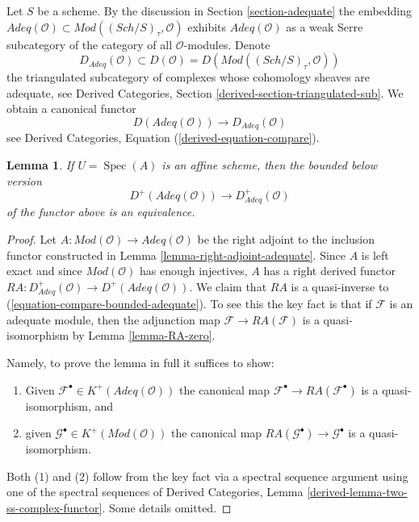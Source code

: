\documentclass{stacks-project}
\theoremstyle{plain}
\newtheorem{lemma}[subsection]{Lemma}
\theoremstyle{definition}
\theoremstyle{remark}
\numberwithin{equation}{subsection}
\def\Spec{\mathop{\mathrm{Spec}}}
\def\Sch{\mathit{Sch}}
\begin{document}
\noindent
Let $S$ be a scheme. By the discussion in
Section \ref{section-adequate}
the embedding
$\textit{Adeq}(\mathcal{O}) \subset
\textit{Mod}((\Sch/S)_\tau, \mathcal{O})$
exhibits $\textit{Adeq}(\mathcal{O})$ as a weak Serre subcategory of
the category of all $\mathcal{O}$-modules. Denote
$$
D_{\textit{Adeq}}(\mathcal{O}) \subset
D(\mathcal{O}) = D(\textit{Mod}((\Sch/S)_\tau, \mathcal{O}))
$$
the triangulated subcategory of complexes whose cohomology sheaves
are adequate, see
Derived Categories, Section \ref{derived-section-triangulated-sub}.
We obtain a canonical functor
$$
D(\textit{Adeq}(\mathcal{O}))
\longrightarrow
D_{\textit{Adeq}}(\mathcal{O})
$$
see
Derived Categories, Equation (\ref{derived-equation-compare}).

\begin{lemma}
\label{lemma-bounded-below}
If $U = \Spec(A)$ is an affine scheme, then the bounded
below version
\begin{equation}
\label{equation-compare-bounded-adequate}
D^+(\textit{Adeq}(\mathcal{O}))
\longrightarrow
D^+_{\textit{Adeq}}(\mathcal{O})
\end{equation}
of the functor above is an equivalence.
\end{lemma}

\begin{proof}
Let $A : \textit{Mod}(\mathcal{O}) \to \textit{Adeq}(\mathcal{O})$
be the right adjoint to the inclusion functor constructed in
Lemma \ref{lemma-right-adjoint-adequate}.
Since $A$ is left exact and since $\textit{Mod}(\mathcal{O})$
has enough injectives, $A$ has a right derived functor
$RA : D^+_{\textit{Adeq}}(\mathcal{O}) \to D^+(\textit{Adeq}(\mathcal{O}))$.
We claim that $RA$ is a quasi-inverse to
(\ref{equation-compare-bounded-adequate}).
To see this the key fact is that if $\mathcal{F}$ is an adequate module, then
the adjunction map $\mathcal{F} \to RA(\mathcal{F})$ is a
quasi-isomorphism by Lemma \ref{lemma-RA-zero}.

\medskip\noindent
Namely, to prove the lemma in full it suffices to show:
\begin{enumerate}
\item Given $\mathcal{F}^\bullet \in K^+(\textit{Adeq}(\mathcal{O}))$
the canonical map $\mathcal{F}^\bullet \to RA(\mathcal{F}^\bullet)$
is a quasi-isomorphism, and
\item given $\mathcal{G}^\bullet \in K^+(\textit{Mod}(\mathcal{O}))$
the canonical map $RA(\mathcal{G}^\bullet) \to \mathcal{G}^\bullet$
is a quasi-isomorphism.
\end{enumerate}
Both (1) and (2) follow from the key fact via a spectral sequence
argument using one of the spectral sequences of
Derived Categories, Lemma \ref{derived-lemma-two-ss-complex-functor}.
Some details omitted.
\end{proof}
\end{document}
